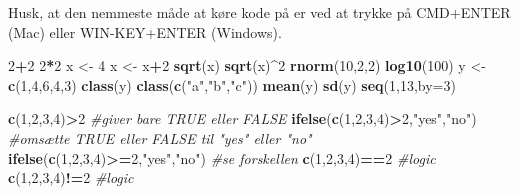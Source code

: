 \documentclass[
]{book}
\newenvironment{Shaded}{\begin{snugshade}}{\end{snugshade}}
\newcommand{\AttributeTok}[1]{\textcolor[rgb]{0.13,0.29,0.53}{#1}}
\newcommand{\CommentTok}[1]{\textcolor[rgb]{0.56,0.35,0.01}{\textit{#1}}}
\newcommand{\DecValTok}[1]{\textcolor[rgb]{0.00,0.00,0.81}{#1}}
\newcommand{\FunctionTok}[1]{\textcolor[rgb]{0.13,0.29,0.53}{\textbf{#1}}}
\newcommand{\NormalTok}[1]{#1}
\newcommand{\OtherTok}[1]{\textcolor[rgb]{0.56,0.35,0.01}{#1}}
\newcommand{\SpecialCharTok}[1]{\textcolor[rgb]{0.81,0.36,0.00}{\textbf{#1}}}
\newcommand{\StringTok}[1]{\textcolor[rgb]{0.31,0.60,0.02}{#1}}
\theoremstyle{definition}
\theoremstyle{definition}
\theoremstyle{definition}
\theoremstyle{definition}
\theoremstyle{remark}
\begin{document}
Husk, at den nemmeste måde at køre kode på er ved at trykke på CMD+ENTER (Mac) eller WIN-KEY+ENTER (Windows).

\begin{Shaded}
\begin{Highlighting}[]
\DecValTok{2}\SpecialCharTok{+}\DecValTok{2}
\DecValTok{2}\SpecialCharTok{*}\DecValTok{2}
\NormalTok{x }\OtherTok{\textless{}{-}} \DecValTok{4}
\NormalTok{x }\OtherTok{\textless{}{-}}\NormalTok{ x}\SpecialCharTok{+}\DecValTok{2}
\FunctionTok{sqrt}\NormalTok{(x)}
\FunctionTok{sqrt}\NormalTok{(x)}\SpecialCharTok{\^{}}\DecValTok{2}
\FunctionTok{rnorm}\NormalTok{(}\DecValTok{10}\NormalTok{,}\DecValTok{2}\NormalTok{,}\DecValTok{2}\NormalTok{)}
\FunctionTok{log10}\NormalTok{(}\DecValTok{100}\NormalTok{)}
\NormalTok{y }\OtherTok{\textless{}{-}}  \FunctionTok{c}\NormalTok{(}\DecValTok{1}\NormalTok{,}\DecValTok{4}\NormalTok{,}\DecValTok{6}\NormalTok{,}\DecValTok{4}\NormalTok{,}\DecValTok{3}\NormalTok{)}
\FunctionTok{class}\NormalTok{(y)}
\FunctionTok{class}\NormalTok{(}\FunctionTok{c}\NormalTok{(}\StringTok{"a"}\NormalTok{,}\StringTok{"b"}\NormalTok{,}\StringTok{"c"}\NormalTok{))}
\FunctionTok{mean}\NormalTok{(y)}
\FunctionTok{sd}\NormalTok{(y)}
\FunctionTok{seq}\NormalTok{(}\DecValTok{1}\NormalTok{,}\DecValTok{13}\NormalTok{,}\AttributeTok{by=}\DecValTok{3}\NormalTok{)}
\end{Highlighting}
\end{Shaded}

\begin{Shaded}
\begin{Highlighting}[]
\FunctionTok{c}\NormalTok{(}\DecValTok{1}\NormalTok{,}\DecValTok{2}\NormalTok{,}\DecValTok{3}\NormalTok{,}\DecValTok{4}\NormalTok{)}\SpecialCharTok{\textgreater{}}\DecValTok{2} \CommentTok{\#giver bare TRUE eller FALSE}
\FunctionTok{ifelse}\NormalTok{(}\FunctionTok{c}\NormalTok{(}\DecValTok{1}\NormalTok{,}\DecValTok{2}\NormalTok{,}\DecValTok{3}\NormalTok{,}\DecValTok{4}\NormalTok{)}\SpecialCharTok{\textgreater{}}\DecValTok{2}\NormalTok{,}\StringTok{"yes"}\NormalTok{,}\StringTok{"no"}\NormalTok{) }\CommentTok{\#omsætte TRUE eller FALSE til "yes" eller "no"}
\FunctionTok{ifelse}\NormalTok{(}\FunctionTok{c}\NormalTok{(}\DecValTok{1}\NormalTok{,}\DecValTok{2}\NormalTok{,}\DecValTok{3}\NormalTok{,}\DecValTok{4}\NormalTok{)}\SpecialCharTok{\textgreater{}=}\DecValTok{2}\NormalTok{,}\StringTok{"yes"}\NormalTok{,}\StringTok{"no"}\NormalTok{) }\CommentTok{\#se forskellen}
\FunctionTok{c}\NormalTok{(}\DecValTok{1}\NormalTok{,}\DecValTok{2}\NormalTok{,}\DecValTok{3}\NormalTok{,}\DecValTok{4}\NormalTok{)}\SpecialCharTok{==}\DecValTok{2} \CommentTok{\#logic}
\FunctionTok{c}\NormalTok{(}\DecValTok{1}\NormalTok{,}\DecValTok{2}\NormalTok{,}\DecValTok{3}\NormalTok{,}\DecValTok{4}\NormalTok{)}\SpecialCharTok{!=}\DecValTok{2} \CommentTok{\#logic}
\end{Highlighting}
\end{Shaded}
\end{document}

